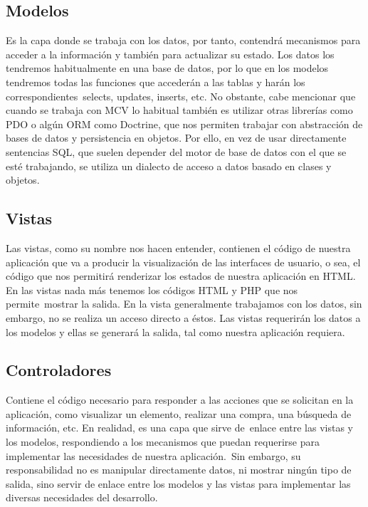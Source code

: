 \subsection{Modelos}

Es la capa donde se trabaja con los datos, por tanto, contendrá mecanismos para acceder a la información y también para actualizar su estado. Los datos los tendremos habitualmente en una base de datos, por lo que en los modelos tendremos todas las funciones que accederán a las tablas y harán los correspondientes selects, updates, inserts, etc.
No obstante, cabe mencionar que cuando se trabaja con MCV lo habitual también es utilizar otras librerías como PDO o algún ORM como Doctrine, que nos permiten trabajar con abstracción de bases de datos y persistencia en objetos. Por ello, en vez de usar directamente sentencias SQL, que suelen depender del motor de base de datos con el que se esté trabajando, se utiliza un dialecto de acceso a datos basado en clases y objetos. \cite{marco3}


\subsection{Vistas}
Las vistas, como su nombre nos hacen entender, contienen el código de nuestra aplicación que va a producir la visualización de las interfaces de usuario, o sea, el código que nos permitirá renderizar los estados de nuestra aplicación en HTML. En las vistas nada más tenemos los códigos HTML y PHP que nos permite mostrar la salida.
En la vista generalmente trabajamos con los datos, sin embargo, no se realiza un acceso directo a éstos. Las vistas requerirán los datos a los modelos y ellas se generará la salida, tal como nuestra aplicación requiera. \cite{marco3}

\subsection{Controladores}
Contiene el código necesario para responder a las acciones que se solicitan en la aplicación, como visualizar un elemento, realizar una compra, una búsqueda de información, etc.
En realidad, es una capa que sirve de enlace entre las vistas y los modelos, respondiendo a los mecanismos que puedan requerirse para implementar las necesidades de nuestra aplicación. Sin embargo, su responsabilidad no es manipular directamente datos, ni mostrar ningún tipo de salida, sino servir de enlace entre los modelos y las vistas para implementar las diversas necesidades del desarrollo. \cite{marco3}




